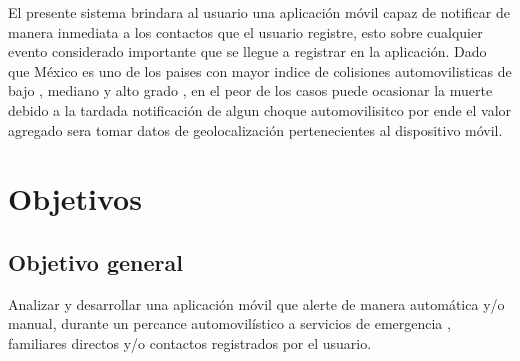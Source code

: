 El presente sistema brindara al usuario una aplicación móvil capaz de notificar de manera inmediata a los contactos que el usuario registre, esto sobre cualquier evento considerado importante que se llegue a registrar en la aplicación. Dado que México es uno de los paises con mayor indice de colisiones automovilisticas de bajo , mediano y alto grado , en el peor de los casos puede ocasionar la muerte  debido a la tardada notificación de algun choque automovilisitco por ende el valor agregado sera tomar datos de geolocalización pertenecientes al dispositivo móvil.


\section{Objetivos}
\subsection{Objetivo general}
Analizar y desarrollar una aplicación móvil que alerte de manera automática y/o manual, durante un percance automovilístico a servicios de emergencia , familiares directos y/o contactos registrados por el usuario.
